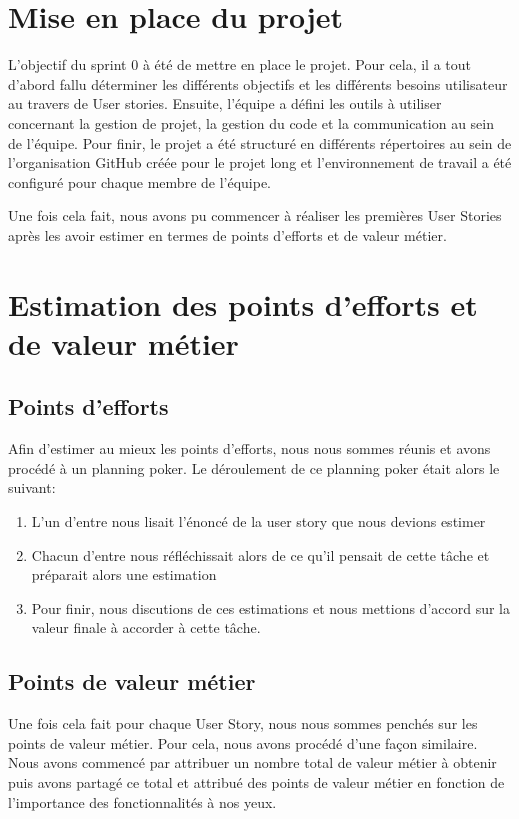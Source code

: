 \documentclass[11pt]{report}
\begin{document}
\section{Mise en place du projet}
L'objectif du sprint 0 à été de mettre en place le projet. Pour cela, il a tout d'abord fallu
déterminer les différents objectifs et les différents besoins utilisateur au travers de User stories. Ensuite, l'équipe a défini
les outils à utiliser concernant la gestion de projet, la gestion du code et la communication au sein de l'équipe.
Pour finir, le projet a été structuré en différents répertoires au sein de l'organisation GitHub créée pour le projet long
et l'environnement de travail a été configuré pour chaque membre de l'équipe.\newline

Une fois cela fait, nous avons pu commencer à réaliser les premières User Stories après les avoir estimer en termes de points d'efforts et de valeur métier.

\section{Estimation des points d'efforts et de valeur métier}

\subsection{Points d'efforts}

Afin d'estimer au mieux les points d'efforts, nous nous sommes réunis et avons procédé à un planning poker. Le déroulement de ce planning poker était alors le suivant:

\begin{enumerate}
  \item L'un d'entre nous lisait l'énoncé de la user story que nous devions estimer
  \item Chacun d'entre nous réfléchissait alors de ce qu'il pensait de cette tâche et préparait alors une estimation
  \item Pour finir, nous discutions de ces estimations et nous mettions d'accord sur la valeur finale à accorder à cette tâche.
\end{enumerate}

\subsection{Points de valeur métier}

Une fois cela fait pour chaque User Story, nous nous sommes penchés sur les points de valeur métier. Pour cela, nous avons procédé d'une façon similaire. Nous avons commencé par attribuer un nombre total de valeur métier à obtenir puis avons partagé ce total et attribué des points de valeur métier en fonction de l'importance des fonctionnalités à nos yeux.
\end{document}
